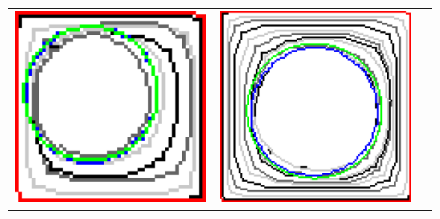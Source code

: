 \begin{figure}[hp!]
\begin{tabular}{ccc}
	\includegraphics[scale=0.17]{figures/chapter5/flow/square/radius_5/ii/elastica/len_pen_0.01000/jonctions_1/best/gs_0.50000/summary.pdf} &	
	
	\includegraphics[scale=0.17]{figures/chapter5/flow/square/radius_5/ii/elastica/len_pen_0.01000/jonctions_1/best/gs_0.25000/summary.pdf}\\[2em]
	

\end{tabular}
\end{figure}
